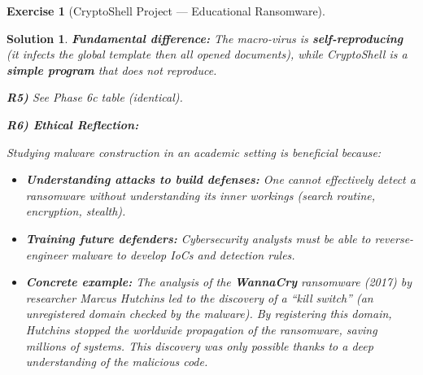 \documentclass[a4paper,11pt]{article}
\theoremstyle{plain}
\newtheorem{correction}{Solution}
\theoremstyle{definition}
\newtheorem{exercice}{Exercise}
\begin{document}
\begin{exercice}[CryptoShell Project --- Educational Ransomware]
\begin{correction}
\textbf{Fundamental difference:} The macro-virus is \textbf{self-reproducing} (it infects the global template then all opened documents), while CryptoShell is a \textbf{simple program} that does not reproduce.

\medskip
\textbf{R5)} See Phase 6c table (identical).

\medskip
\textbf{R6) Ethical Reflection:}

Studying malware construction in an academic setting is beneficial because:
\begin{itemize}
    \item \textbf{Understanding attacks to build defenses:} One cannot effectively detect a ransomware without understanding its inner workings (search routine, encryption, stealth).
    \item \textbf{Training future defenders:} Cybersecurity analysts must be able to reverse-engineer malware to develop IoCs and detection rules.
    \item \textbf{Concrete example:} The analysis of the \textbf{WannaCry} ransomware (2017) by researcher Marcus Hutchins led to the discovery of a ``kill switch'' (an unregistered domain checked by the malware). By registering this domain, Hutchins stopped the worldwide propagation of the ransomware, saving millions of systems. This discovery was only possible thanks to a deep understanding of the malicious code.
\end{itemize}

\end{correction}


\end{exercice}
\end{document}
